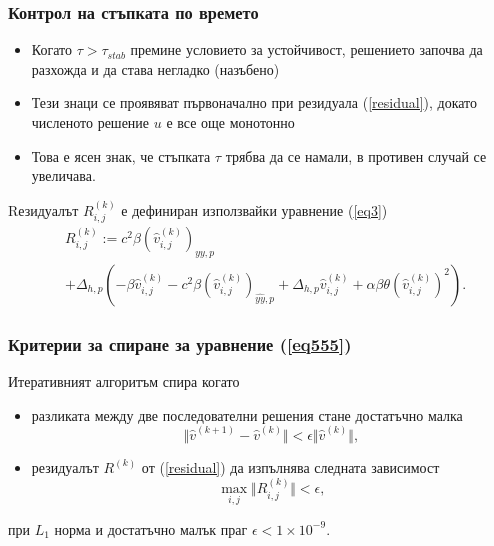 \documentclass{beamer}
\newcommand{\rf}[1]{(\ref{#1})}
\begin{document}
\begin{frame}
\frametitle{Контрол на стъпката по времето}

\begin{itemize}
  \item Когато $\tau > \tau_{stab}$ премине условието за устойчивост, решението започва да разхожда и да става негладко (назъбено)

  \item Тези знаци се проявяват първоначално при резидуала \rf{residual}, докато численото решение $u$ е все още монотонно

  \item Това е ясен знак, че стъпката $\tau$ трябва да се намали, в противен случай се увеличава.
\end{itemize}
Rезидуалът $R_{i,j}^{(k)}$ е дефиниран използвайки уравнение \rf{eq3}
\begin{align}\label{residual}
&R_{i,j}^{(k)} := 
c^2\beta (\widehat{v}^{(k)}_{i,j})_{\widehat{yy},p}  \nonumber \\
&+ \Delta_{h,p}(-\beta \widehat{v}^{(k)}_{i,j} - c^2\beta (\widehat{v}^{(k)}_{i,j})_{\widehat{yy},p} + \Delta_{h,p} \widehat{v}^{(k)}_{i,j} 
+ \alpha \beta \theta (\widehat{v}^{(k)}_{i,j})^2  ).
\end{align}

\end{frame}

\begin{frame}
\frametitle{Критерии за спиране за уравнение \rf{eq555}}

Итеративният алгоритъм спира когато
\begin{itemize}
  \item разликата между две последователни решения стане достатъчно малка
	\begin{equation*}
	\Vert \widehat{v}^{(k+1)}-\widehat{v}^{(k)}\Vert  < \epsilon \Vert \widehat{v}^{(k)}\Vert ,
	\end{equation*}
\end{itemize}


\begin{itemize}
  \item резидуалът $R^{(k)}$ от \rf{residual} да изпълнява следната зависимост
	\begin{equation}\label{crit2}
	\max_{i,j} \Vert R_{i,j}^{(k)} \Vert < \epsilon,
	\end{equation}
\end{itemize}
при $L_1$ норма и достатъчно малък праг $\epsilon < 1\times10^{-9}$.

\end{frame}
\end{document}
